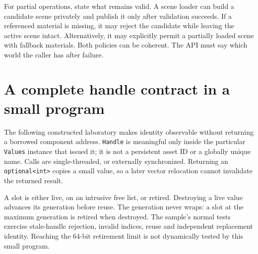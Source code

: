 For partial operations, state what remains valid. A scene loader can build a candidate scene privately and publish it only after validation succeeds. If a referenced material is missing, it may reject the candidate while leaving the active scene intact. Alternatively, it may explicitly permit a partially loaded scene with fallback materials. Both policies can be coherent. The API must say which world the caller has after failure.

\section{A complete handle contract in a small program}\label{01-foundations-i-ch008-a-complete-handle-contract-in-a-small-program}

The following constructed laboratory makes identity observable without returning a borrowed component address. \texttt{Handle} is meaningful only inside the particular \texttt{Values} instance that issued it; it is not a persistent asset ID or a globally unique name. Calls are single-threaded, or externally synchronized. Returning an \texttt{optional\textless{}int\textgreater{}} copies a small value, so a later vector relocation cannot invalidate the returned result.

A slot is either live, on an intrusive free list, or retired. Destroying a live value advances its generation before reuse. The generation never wraps: a slot at the maximum generation is retired when destroyed. The sample's normal tests exercise stale-handle rejection, invalid indices, reuse and independent replacement identity. Reaching the 64-bit retirement limit is not dynamically tested by this small program.

